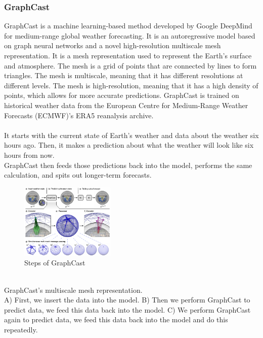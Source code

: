 \documentclass[../paper.tex]{subfiles}
\begin{document}
    \subsubsection{GraphCast}
        GraphCast is a machine learning-based method developed by Google DeepMind for medium-range global weather forecasting.
        It is an autoregressive model based on graph neural networks and a novel high-resolution multiscale mesh representation.
        It is a mesh representation used to represent the Earth's surface and atmosphere.
        The mesh is a grid of points that are connected by lines to form triangles.
        The mesh is multiscale, meaning that it has different resolutions at different levels.
        The mesh is high-resolution, meaning that it has a high density of points, which allows for more accurate predictions.
        GraphCast is trained on historical weather data from the European Centre for Medium-Range Weather Forecasts (ECMWF)'s ERA5 reanalysis archive\cite{e1}.
        \\\\
        It starts with the current state of Earth's weather and data about the weather six hours ago.
        Then, it makes a prediction about what the weather will look like six hours from now.\\
        GraphCast then feeds those predictions back into the model, performs the same calculation, and spits out longer-term forecasts\cite{e1}.\\
        \begin{figure}[htbp]
            \centerline{\includegraphics[width=0.4\textwidth]{../photos/multimesh_graphcast}}
            \caption{Steps of GraphCast}
            \label{fig:multimesh-graphcast}
        \end{figure}\\
        GraphCast's multiscale mesh representation. \\
        A) First, we insert the data into the model.
        B) Then we perform GraphCast to predict data, we feed this data back into the model.
        C) We perform GraphCast again to predict data, we feed this data back into the model and do this repeatedly.
\end{document}
